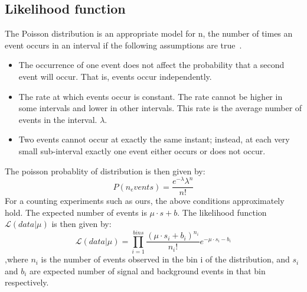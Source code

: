\subsection{Likelihood function}
The Poisson distribution is an appropriate model for n, the number of times an event occurs in an interval if the following assumptions are true~\cite{poisson_wiki}.
\begin{itemize}
\item The occurrence of one event does not affect the probability that a second event will occur. That is, events occur independently.
\item The rate at which events occur is constant. The rate cannot be higher in some intervals and lower in other intervals. This rate is the average number of events in the interval. $\lambda$.
\item Two events cannot occur at exactly the same instant; instead, at each very small sub-interval exactly one event either occurs or does not occur.
\end{itemize}
The poisson probablity of distribution is then given by:
\begin{equation}
  P(n_events)=\frac{e^{-\lambda}\lambda^{n}}{n!}
\end{equation}
For a counting experiments such as ours, the above conditions approximately hold. The expected number of events is $\mu\cdot s + b$. The likelihood function $\mathcal{L}(data|\mu)$ is then given by:
\begin{equation}
  \mathcal{L}(data|\mu)=\prod_{i=1}^{bins}\frac{(\mu\cdot s_i + b_i)^{n_i}}{n_{i}!}e^{-\mu\cdot s_i - b_i}
\end{equation}
,where $n_i$ is the number of events observed in the bin i of the distribution, and $s_i$ and $b_i$ are expected number of signal and background events in that bin respectively.


